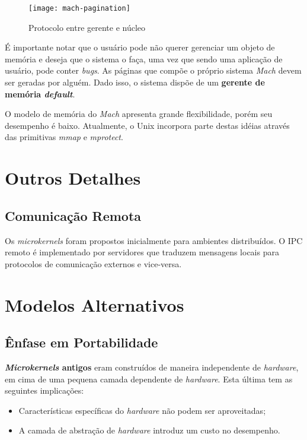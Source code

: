 \begin{figure}[h]
  \centering
  \texttt{[image: mach-pagination]}
  \caption{Protocolo entre gerente e núcleo}
  \label{fig:mach-pagination}
\end{figure}

É importante notar que o usuário pode não querer gerenciar um objeto de memória e deseja que o sistema o faça, uma vez que sendo uma aplicação de usuário, pode conter \textit{bugs}. As páginas que compõe o próprio sistema \textit{Mach} devem ser geradas por alguém. Dado isso, o sistema dispõe de um \textbf{gerente de memória \textit{default}}.

O modelo de memória do \textit{Mach} apresenta grande flexibilidade, porém seu desempenho é baixo. Atualmente, o Unix incorpora parte destas idéias através das primitivas \textit{mmap} e \textit{mprotect}.









\section{Outros Detalhes}

\subsection{Comunicação Remota}
Os \textit{microkernels} foram propostos inicialmente para ambientes distribuídos. O IPC remoto é implementado por servidores que traduzem mensagens locais para protocolos de comunicação externos e vice-versa.





\section{Modelos Alternativos}

\subsection{Ênfase em Portabilidade}
\textbf{\textit{Microkernels} antigos} eram construídos de maneira independente de \textit{hardware}, em cima de uma pequena camada dependente de \textit{hardware}. Esta última tem as seguintes implicações:
\begin{itemize}
  \item Características específicas do \textit{hardware} não podem ser aproveitadas;

  \item A camada de abstração de \textit{hardware} introduz um custo no desempenho.
\end{itemize}

